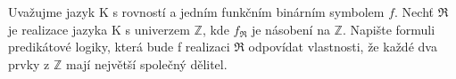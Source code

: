 Uvažujme jazyk K s rovností a jedním funkčním binárním symbolem $f$. Nechť $\Re$
je realizace jazyka K s univerzem $\mathbb{Z}$, kde $f_{\Re}$ je násobení na
$\mathbb{Z}$. Napište formuli predikátové logiky, která bude f realizaci $\Re$
odpovídat vlastnosti, že každé dva prvky z $\mathbb{Z}$ mají největší společný
dělitel.
